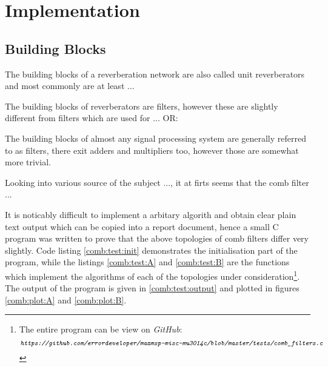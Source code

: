 \documentclass[12pt]{report}
\newcommand{\URL}[1]{\[ \texttt{\emph{#1}} \]}
\newcommand{\href}[2]{#2 (\texttt{\emph{\url{#1}}})} %
\newcommand{\Href}[2]{{#2}} %
\newcommand{\Href}[2]{\href{#1}{#2}} %
\newcommand{\URL}[1]{\[ \Href{#1}{\texttt{\emph{#1}}} \]}
\begin{document}
\section{Implementation}


  \subsection{Building Blocks}

  The building blocks of a reverberation network are also called unit
  reverberators and most commonly are at least  ...

  The building blocks of reverberators are filters, however these are slightly
  different from filters which are used for ...
  OR:

  The building blocks of almost any signal processing system are generally
  referred to as filters, there exit adders and multipliers too, however
  those are somewhat more trivial. 


  Looking into various source of the subject ..., it at firts seems that the
  comb filter ...

  It is noticably difficult to implement a arbitary algorith and obtain clear
  plain text output which can be copied into a report document, hence a small
  C program was written to prove that the above topologies of comb filters
  differ very slightly. Code listing \ref{comb:test:init} demonstrates the
  initialisation part of the program, while the listings \ref{comb:test:A}
  and \ref{comb:test:B} are the functions which implement the algorithms of
  each of the topologies under consideration\footnote{The entire program can
  be view on \emph{GitHub}:
  \URL{https://github.com/errordeveloper/maxmsp-misc-mu3014c/blob/master/tests/comb\_filters.c}}.
  The output of the program is given in \ref{comb:test:output} and plotted in
  figures \ref{comb:plot:A} and \ref{comb:plot:B}.



%
%


\end{document}
